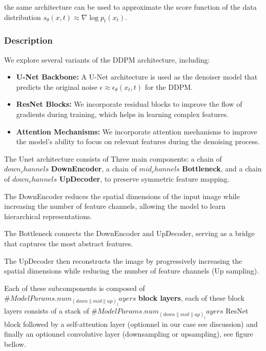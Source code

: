 \documentclass[twocolumn,superscriptaddress,aps]{revtex4-1}
\begin{document}
the same architecture can be used to approximate the score function of the data distribution $s_\theta(x , t) \approx \nabla \log p_t(x_t)$.

\subsubsection{Description}

We explore several variants of the DDPM architecture, including:

\begin{itemize}
    \item \textbf{U-Net Backbone:} A U-Net architecture is used as the denoiser model that predicts the original noise $\epsilon \approx\epsilon_\theta(x_t, t)$ for the DDPM.
    \item \textbf{ResNet Blocks:} We incorporate residual blocks to improve the flow of gradients during training, which helps in learning complex features.
    \item \textbf{Attention Mechanisms:} We incorporate attention mechanisms to improve the model's ability to focus on relevant features during the denoising process.
\end{itemize}

The Unet architecture consists of Three main components: a chain of $down_channels$ \textbf{DownEncoder}, a chain of $mid_channels$ \textbf{Bottleneck}, and a chain of $down_channels$ \textbf{UpDecoder}, to preserve symmetric feature mapping.

The DownEncoder reduces the spatial dimensions of the input image while increasing the number of feature channels, allowing the model to learn hierarchical representations.

The Bottleneck connects the DownEncoder and UpDecoder, serving as a bridge that captures the most abstract features.

The UpDecoder then reconstructs the image by progressively increasing the spatial dimensions while reducing the number of feature channels (Up sampling).

Each of these subcomponents is composed of $\#ModelParams.num_(down\|mid\|up)_layers$ \textbf{block layers}, each of these block layers consists of a stack of $\#ModelParams.num_(down\|mid\|up)_layers$ ResNet block followed by a self-attention layer (optionnel in our case see discussion) and finally an optionnel convolutive layer (downsampling or upsampling), see figure bellow.
\end{document}
